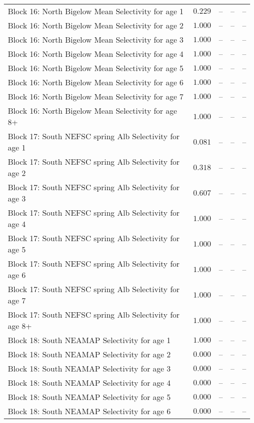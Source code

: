\documentclass[
]{article}
\begin{document}
\begin{landscape}
\begin{longtable}[t]{lrrrr}
Block 16: North Bigelow Mean Selectivity for age 1 & $0.229$ & -- & -- & --\\
Block 16: North Bigelow Mean Selectivity for age 2 & $1.000$ & -- & -- & --\\
Block 16: North Bigelow Mean Selectivity for age 3 & $1.000$ & -- & -- & --\\
\addlinespace
Block 16: North Bigelow Mean Selectivity for age 4 & $1.000$ & -- & -- & --\\
Block 16: North Bigelow Mean Selectivity for age 5 & $1.000$ & -- & -- & --\\
Block 16: North Bigelow Mean Selectivity for age 6 & $1.000$ & -- & -- & --\\
Block 16: North Bigelow Mean Selectivity for age 7 & $1.000$ & -- & -- & --\\
Block 16: North Bigelow Mean Selectivity for age 8+ & $1.000$ & -- & -- & --\\
\addlinespace
Block 17: South NEFSC spring Alb Selectivity for age 1 & $0.081$ & -- & -- & --\\
Block 17: South NEFSC spring Alb Selectivity for age 2 & $0.318$ & -- & -- & --\\
Block 17: South NEFSC spring Alb Selectivity for age 3 & $0.607$ & -- & -- & --\\
Block 17: South NEFSC spring Alb Selectivity for age 4 & $1.000$ & -- & -- & --\\
Block 17: South NEFSC spring Alb Selectivity for age 5 & $1.000$ & -- & -- & --\\
\addlinespace
Block 17: South NEFSC spring Alb Selectivity for age 6 & $1.000$ & -- & -- & --\\
Block 17: South NEFSC spring Alb Selectivity for age 7 & $1.000$ & -- & -- & --\\
Block 17: South NEFSC spring Alb Selectivity for age 8+ & $1.000$ & -- & -- & --\\
Block 18: South NEAMAP Selectivity for age 1 & $1.000$ & -- & -- & --\\
Block 18: South NEAMAP Selectivity for age 2 & $0.000$ & -- & -- & --\\
\addlinespace
Block 18: South NEAMAP Selectivity for age 3 & $0.000$ & -- & -- & --\\
Block 18: South NEAMAP Selectivity for age 4 & $0.000$ & -- & -- & --\\
Block 18: South NEAMAP Selectivity for age 5 & $0.000$ & -- & -- & --\\
Block 18: South NEAMAP Selectivity for age 6 & $0.000$ & -- & -- & --\\

\end{longtable}
\end{landscape}
\end{document}
